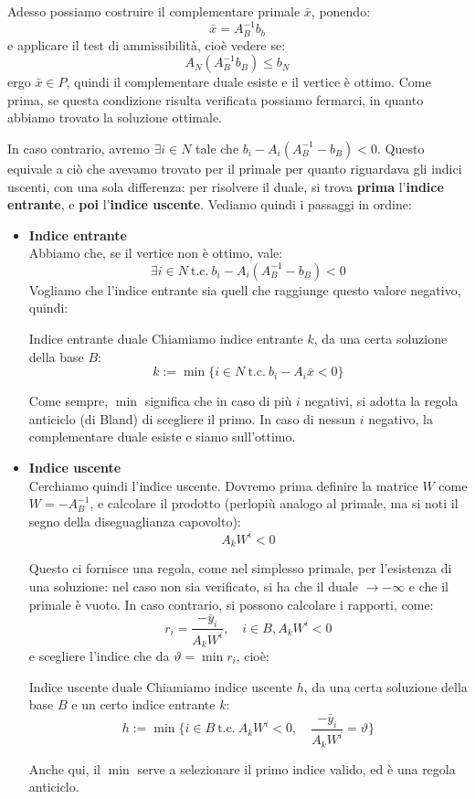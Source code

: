\documentclass[a4paper,11pt]{article}
\begin{document}
Adesso possiamo costruire il complementare primale $\bar{x}$, ponendo:
$$
\bar{x} = A_B^{-1}b_b 
$$
e applicare il test di ammissibilità, cioè vedere se:
$$
A_N(A_B^{-1} b_B) \leq b_N
$$
ergo $\bar{x} \in P$, quindi il complementare duale esiste e il vertice è ottimo.
Come prima, se questa condizione risulta verificata possiamo fermarci, in quanto abbiamo trovato la soluzione ottimale.

In caso contrario, avremo $\exists i \in N$ tale che $b_i - A_i (A_B^{-1} - b_B) < 0$.
Questo equivale a ciò che avevamo trovato per il primale per quanto riguardava gli indici uscenti, con una sola differenza: per risolvere il duale, si trova \textbf{prima} l'\textbf{indice entrante}, e \textbf{poi} l'\textbf{indice uscente}.
Vediamo quindi i passaggi in ordine:

\begin{itemize}
	\item \textbf{\textsf{Indice entrante}} \\
Abbiamo che, se il vertice non è ottimo, vale:
$$
\exists i \in N \ \text{t.c.} \ b_i - A_i (A_B^{-1} - b_B) < 0
$$
Vogliamo che l'indice entrante sia quell che raggiunge questo valore negativo, quindi:
\begin{definition}{Indice entrante duale}
Chiamiamo indice entrante $k$, da una certa soluzione della base $B$:
$$k := \min\{ i \in N \ \text{t.c.} \ b_i - A_i \bar{x} < 0 \}$$
\end{definition}
Come sempre, $\min$ significa che in caso di più $i$ negativi, si adotta la regola anticiclo (di Bland) di scegliere il primo.
In caso di nessun $i$ negativo, la complementare duale esiste e siamo sull'ottimo.

	\item \textbf{\textsf{Indice uscente}} \\
Cerchiamo quindi l'indice uscente.
Dovremo prima definire la matrice $W$ come $ W = -A_B^{-1}$, e  calcolare il prodotto (perlopiù analogo al primale, ma si noti il segno della diseguaglianza capovolto):
$$ 
A_k W^i < 0
$$

Questo ci fornisce una regola, come nel simplesso primale, per l'esistenza di una soluzione: nel caso non sia verificato, si ha che il duale $\rightarrow -\infty$ e che il primale è vuoto.
In caso contrario, si possono calcolare i rapporti, come:
$$
r_i = \frac{-\bar{y}_i}{A_kW^i}, \quad i \in B, A_k W^i < 0
$$
e scegliere l'indice che da $\vartheta = \min{r_i}$, cioè:
\begin{definition}{Indice uscente duale}
	Chiamiamo indice uscente $h$, da una certa soluzione della base $B$ e un certo indice entrante $k$:
	$$
	h := \min\{ i \in B \ \text{t.c.} \ A_k W^i < 0, \quad \frac{-\bar{y}_i}{A_kW^i} = \vartheta \}	
	$$
\end{definition}
Anche qui, il $\min$ serve a selezionare il primo indice valido, ed è una regola anticiclo.
\end{itemize}
\end{document}
